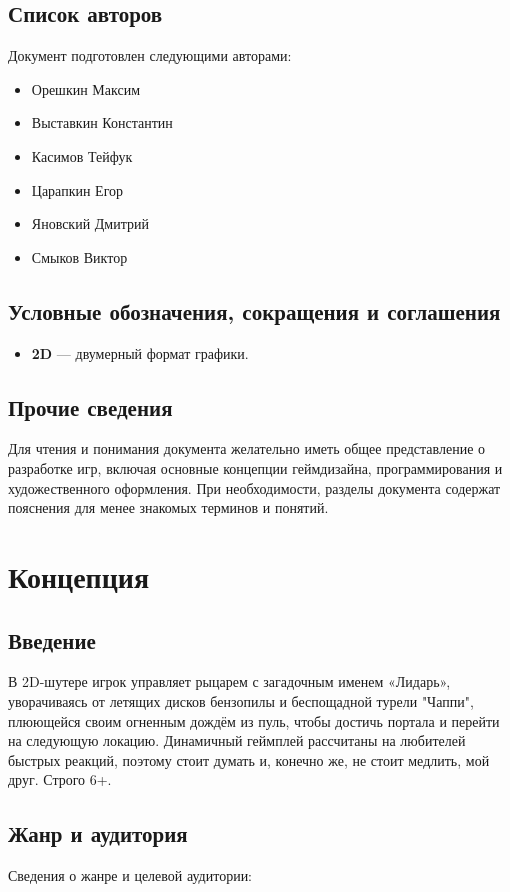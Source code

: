 \documentclass[a4paper,12pt]{article}
\begin{document}
\subsection{Список авторов}
Документ подготовлен следующими авторами:
\begin{itemize}
    \item Орешкин Максим
    \item Выставкин Константин
    \item Касимов Тейфук
    \item Царапкин Егор
    \item Яновский Дмитрий
    \item Смыков Виктор
\end{itemize}

\subsection{Условные обозначения, сокращения и соглашения}
\begin{itemize}
    \item \textbf{2D} — двумерный формат графики.
\end{itemize}

\subsection{Прочие сведения}
Для чтения и понимания документа желательно иметь общее представление о разработке игр, включая основные концепции геймдизайна, программирования и художественного оформления. При необходимости, разделы документа содержат пояснения для менее знакомых терминов и понятий.

\section{Концепция}
\subsection{Введение}
В 2D-шутере игрок управляет рыцарем с загадочным именем «Лидарь», уворачиваясь от летящих дисков бензопилы и беспощадной турели "Чаппи", плюющейся своим огненным дождём из пуль, чтобы достичь портала и перейти на следующую локацию.
Динамичный геймплей рассчитаны на любителей быстрых реакций, поэтому стоит думать и, конечно же, не стоит медлить, мой друг. Строго 6+.

\subsection{Жанр и аудитория}
Сведения о жанре и целевой аудитории:
\end{document}
